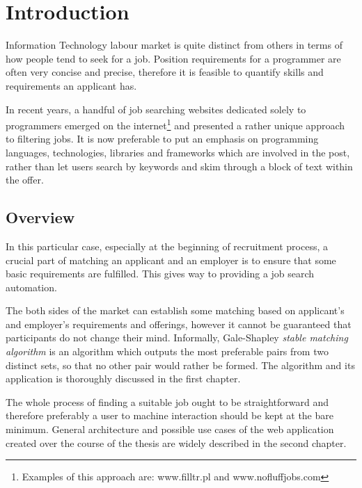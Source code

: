 \chapter{Introduction}
\ifpdf
    \graphicspath{{Introduction/IntroductionFigs/PNG/}{Introduction/IntroductionFigs/PDF/}{Introduction/IntroductionFigs/}}
\else
    \graphicspath{{Introduction/IntroductionFigs/EPS/}{Introduction/IntroductionFigs/}}
\fi

Information Technology labour market is quite distinct from others in terms of how people tend to seek for a job. Position requirements for a programmer are often very concise and precise, therefore it is feasible to quantify skills and requirements an applicant has.

In recent years, a handful of job searching websites dedicated solely to programmers emerged on the internet\footnote{Examples of this approach are: www.filltr.pl and www.nofluffjobs.com} and presented a rather unique approach to filtering jobs. It is now preferable to put an emphasis on programming languages, technologies, libraries and frameworks which are involved in the post, rather than let users search by keywords and skim through a block of text within the offer.

\section{Overview}
In this particular case, especially at the beginning of recruitment process, a crucial part of matching an applicant and an employer is to ensure that some basic requirements are fulfilled. This gives way to providing a job search automation.

The both sides of the market can establish some matching based on applicant's and employer's requirements and offerings, however it cannot be guaranteed that participants do not change their mind. Informally, Gale-Shapley \textit{stable matching algorithm} is an algorithm which outputs the most preferable pairs from two distinct sets, so that no other pair would rather be formed. The algorithm and its application is thoroughly discussed in the first chapter.

The whole process of finding a suitable job ought to be straightforward and therefore preferably a user to machine interaction should be kept at the bare minimum. General architecture and possible use cases of the web application created over the course of the thesis are widely described in the second chapter.

